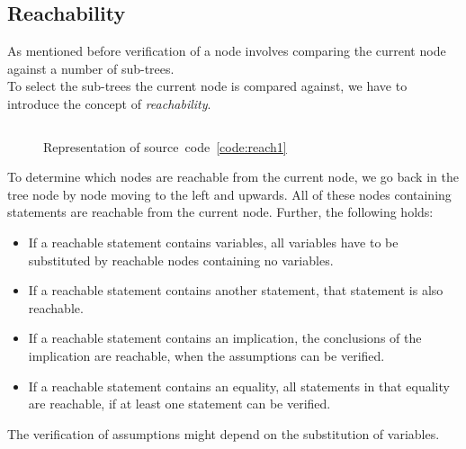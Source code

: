 \documentclass[british]{article}
\newenvironment{code}{\captionsetup{type=listing}}{}
\newcommand\prv{bc}
\begin{document}
\pagebreak{}

\subsection{Reachability}\label{sec:reach}


As mentioned before verification of a node involves comparing the current node
against a number of sub-trees.\\ To select the sub-trees the current node is
compared against, we have to introduce the concept of \emph{reachability}.


\begin{code}
\label{code:reach1}
\inputminted[linenos]{\prv}{examples/reach1.prove}
\end{code}

\begin{figure}[!h]
\caption{Representation of source~code~\ref{code:reach1}}\label{fig:reach1}
\centering
{}
\end{figure}

To determine which nodes are reachable from the current node, we go back in the
tree node by node moving to the left and upwards. All of these nodes containing
statements are reachable from the current node. Further, the following holds:

\begin{itemize}
	\item
		If a reachable statement contains variables, all variables have to be
		substituted by reachable nodes containing no variables.
	\item
		If a reachable statement contains another statement, that statement is
		also reachable.
	\item
		If a reachable statement contains an implication, the conclusions of the
		implication are reachable, when the assumptions can be verified. 
	\item
		If a reachable statement contains an equality, all statements in that
		equality are reachable, if at least one statement can be verified.
\end{itemize}

The verification of assumptions might depend on the substitution of variables.
\newline
\end{document}
